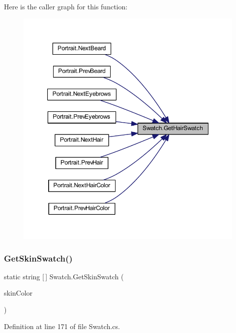 Here is the caller graph for this function\+:
\nopagebreak
\begin{figure}[H]
\begin{center}
\leavevmode
\includegraphics[width=347pt]{class_swatch_ad9aee8913b15b1cd21e4d734aeb00f6b_icgraph}
\end{center}
\end{figure}
\mbox{\label{class_swatch_aad8681cfc4c7902a684220e08e67b00b}} 
\subsubsection{\texorpdfstring{GetSkinSwatch()}{GetSkinSwatch()}}
{\footnotesize\ttfamily static string \mbox{[}$\,$\mbox{]} Swatch.\+Get\+Skin\+Swatch (\begin{DoxyParamCaption}\item[{\mbox{\hyperlink{class_character_a726214a0fe480fffada7772697764824}{Character.\+Skin\+Color}}}]{skin\+Color }\end{DoxyParamCaption})\hspace{0.3cm}{\ttfamily [static]}}



Definition at line 171 of file Swatch.\+cs.


